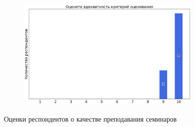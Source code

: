 \begin{figure}[H]
\begin{subfigure}[b]{0.45\textwidth}
			\end{subfigure}
			\begin{subfigure}[b]{0.45\textwidth}
				\centering
				\includegraphics[width=\textwidth]{images/2 course/Дифференциальные уравнения/seminarists-marks-Петрович А.Ю.-3.png}
			\end{subfigure}	
			\caption{Оценки респондентов о качестве преподавания семинаров}
		\end{figure}

        
